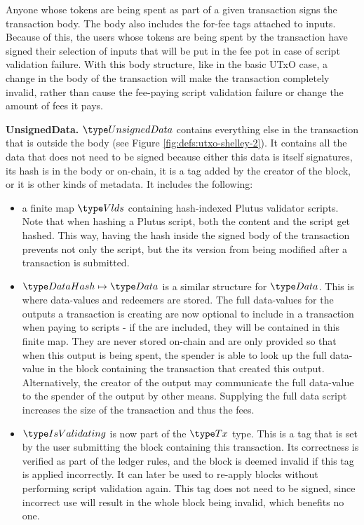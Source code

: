Anyone whose tokens are being spent as part of a given transaction
signs the transaction body. The body also includes the for-fee tags attached to inputs.
Because of this, the users whose tokens are being spent by the transaction have
signed their selection of
inputs that will be put in the fee pot in case of script validation failure.
With this body structure, like in the basic UTxO case, a change in the body of the transaction
will make the transaction completely invalid, rather than cause the fee-paying script validation
failure or change the amount of fees it pays.

\textbf{UnsignedData.}
$\UnsignedData$ contains everything else in the transaction that is outside the
body (see Figure \ref{fig:defs:utxo-shelley-2}).
It contains all the data that does not need to be signed because either
this data is itself signatures, its hash is in the body or on-chain, it is a tag
added by the creator of the block, or it is other kinds of metadata. It includes
the following:

\begin{itemize}
  \item a finite map $\Vlds$ containing hash-indexed Plutus validator scripts.
  Note that when hashing a Plutus script, both the content and the script get
  hashed. This way, having the hash inside the signed body of the transaction
  prevents not only the script, but the its version from being modified
  after a transaction is submitted.
  \item $\DataHash \mapsto \Data$ is a similar structure for $\Data$.
  This is where data-values and redeemers are stored.
  The full data-values for the outputs a transaction is creating
  are now optional to include in a transaction when
  paying to scripts - if the are included, they will be contained in
  this finite map. They are never
  stored on-chain and are only provided so that when this output is being spent,
  the spender is
  able to look up the full data-value in the block containing the transaction
  that created this output. Alternatively, the creator of the output
  may communicate the full data-value to the spender of the output by
  other means.
  Supplying the full data script increases the size of the transaction and
  thus the fees.
  \item $\IsValidating$ is now part of the $\Tx$ type. This is a tag that is
  set by the user submitting the block containing this transaction.
  Its correctness is verified as part of the ledger rules, and the block is
  deemed invalid if this tag is applied incorrectly.
  It can later be used to re-apply blocks without performing script validation
  again. This tag does not need to be signed, since incorrect use will result
  in the whole block being invalid, which benefits no one.
\end{itemize}

